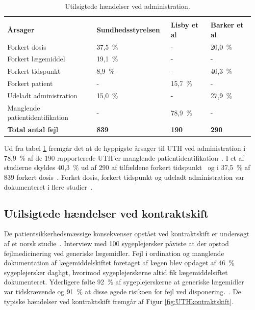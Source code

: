 \vspace{2mm}
\begin{longtable}{p{5.5cm}|p{3.5cm}|p{2cm}|p{2.3cm}}
	\caption{Utilsigtede hændelser ved administration.}
	\vspace{2mm}
	\label{table:UTHAdministration} \\
\cellcolor[HTML]{C0C0C0} {\textbf{Årsager}} & 
{\cellcolor[HTML]{C0C0C0}\textbf{Sundhedsstyrelsen~\citep{Sundhedsstyrelsen2005}}} &
{\cellcolor[HTML]{C0C0C0}\textbf{Lisby et al~\citep{Lisby2005}}} &
{\cellcolor[HTML]{C0C0C0}\textbf{Barker et al~\citep{Barker2002}}} \\ \hline
Forkert dosis & 37,5~\% & - & 20,0~\% \\ \hline
Forkert lægemiddel & 19,1~\% & - & - \\ \hline
Forkert tidspunkt & 8,9~\% & - & 40,3~\% \\ \hline
Forkert patient & - & 15,7~\% &  - \\ \hline
Udeladt administration & 15,0~\% & - & 27,9~\% \\ \hline
Manglende patientidentifikation & - & 78,9~\% & - \\ \hline
\cellcolor[HTML]{C0C0C0} {\textbf{Total antal fejl}} & 
{\cellcolor[HTML]{C0C0C0}\textbf{839}} &
{\cellcolor[HTML]{C0C0C0}\textbf{190}} &
{\cellcolor[HTML]{C0C0C0}\textbf{290}}
\end{longtable}
\vspace{0.25cm}

Ud fra tabel \ref{table:UTHAdministration} fremgår det at de hyppigste årsager til UTH ved administration i 78,9~\% af de 190 rapporterede UTH'er manglende patientidentifikation~\citep{Lisby2005}. I et af studierne skyldes 40,3~\% ud af 290 af tilfældene forkert tidspunkt~\citep{Barker2002} og i 37,5~\% af 839 forkert dosis~\citep{Sundhedsstyrelsen2005}. Forket dosis, forkert tidspunkt og udeladt administration var dokumenteret i flere studier~\citep{Lisby2005,Sundhedsstyrelsen2005,Barker2002}.

\subsection{Utilsigtede hændelser ved kontraktskift}
De patientsikkerhedsmæssige konsekvenser opstået ved kontraktskift er undersøgt af et norsk studie~\citep{Hakonsen2010}. Interview med 100 sygeplejersker påviste at der opstod fejlmedicinering ved generiske lægemidler. Fejl i ordination og manglende dokumentation af lægemiddelskiftet foretaget af lægen blev opdaget af 46~\% sygeplejersker dagligt, hvorimod sygeplejerskerne altid fik lægemiddelsiftet dokumenteret. Yderligere følte 92~\% af sygeplejerskerne at generiske lægemidler var tidskrævende og 91~\% at disse øgede risikoen for fejl ved disponering.~\citep{Hakonsen2010}. De typiske hændelser ved kontraktskift fremgår af Figur \ref{fig:UTHkontraktskift}.

